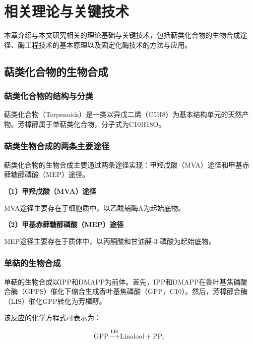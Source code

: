 \section{相关理论与关键技术}


本章介绍与本文研究相关的理论基础与关键技术，包括萜类化合物的生物合成途径、酶工程技术的基本原理以及固定化酶技术的方法与应用。

\subsection{萜类化合物的生物合成}

\subsubsection{萜类化合物的结构与分类}


萜类化合物（Terpenoids）是一类以异戊二烯（C5H8）为基本结构单元的天然产物。芳樟醇属于单萜类化合物，分子式为C10H18O。

\subsubsection{萜类生物合成的两条主要途径}

萜类化合物的生物合成主要通过两条途径实现：甲羟戊酸（MVA）途径和甲基赤藓糖醇磷酸（MEP）途径。

\textbf{（1）甲羟戊酸（MVA）途径}

MVA途径主要存在于细胞质中，以乙酰辅酶A为起始底物。

\textbf{（2）甲基赤藓糖醇磷酸（MEP）途径}

MEP途径主要存在于质体中，以丙酮酸和甘油醛-3-磷酸为起始底物。

\subsubsection{单萜的生物合成}

单萜的生物合成以IPP和DMAPP为前体。首先，IPP和DMAPP在香叶基焦磷酸合酶（GPPS）催化下缩合生成香叶基焦磷酸（GPP，C10）。然后，芳樟醇合酶（LIS）催化GPP转化为芳樟醇。

该反应的化学方程式可表示为：

\begin{equation}
\text{GPP} \xrightarrow{\text{LIS}} \text{Linalool} + \text{PP}_i
\end{equation}

